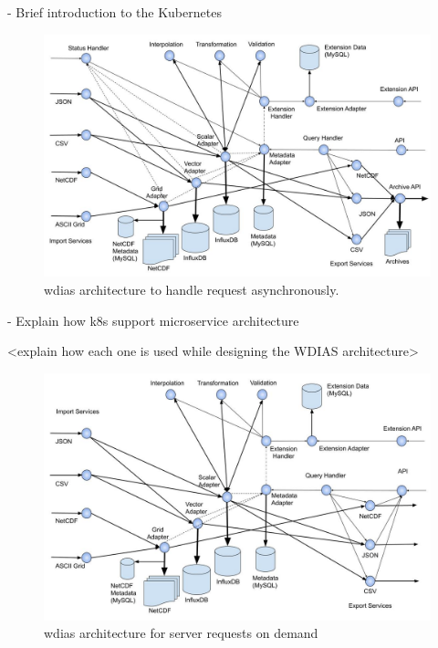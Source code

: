 - Brief introduction to the Kubernetes

\begin{figure}[htp]
    \centering
    \includegraphics[width=1\textwidth]{method/microservice/microservice_architecture-handle_on_async-v3.jpg}
    \caption{\acrshort{wdias} architecture to handle request asynchronously.}
    \label{fi:wdias_micro_async}
\end{figure}

- Explain how k8s support microservice architecture

<explain how each one is used while designing the WDIAS architecture>

\begin{figure}[htp]
    \centering
    \includegraphics[width=1\textwidth]{method/microservice/microservice_architecture-handle_on_demand-v3.jpg}
    \caption{\acrshort{wdias} architecture for server requests on demand}
    \label{fi:wdias_micro_on_demand}
\end{figure}

